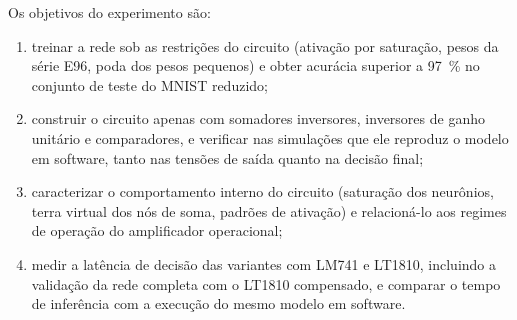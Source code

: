 Os objetivos do experimento são:
\begin{enumerate}
  \item treinar a rede sob as restrições do circuito (ativação por
        saturação, pesos da série E96, poda dos pesos pequenos) e
        obter acurácia superior a \SI{97}{\percent} no conjunto de
        teste do MNIST reduzido;
  \item construir o circuito apenas com somadores inversores,
        inversores de ganho unitário e comparadores, e verificar nas
        simulações que ele reproduz o modelo em software, tanto nas
        tensões de saída quanto na decisão final;
  \item caracterizar o comportamento interno do circuito (saturação
        dos neurônios, terra virtual dos nós de soma, padrões de
        ativação) e relacioná-lo aos regimes de operação do
        amplificador operacional;
  \item medir a latência de decisão das variantes com LM741 e LT1810,
        incluindo a validação da rede completa com o LT1810
        compensado, e comparar o tempo de inferência com a execução do
        mesmo modelo em software.
\end{enumerate}
